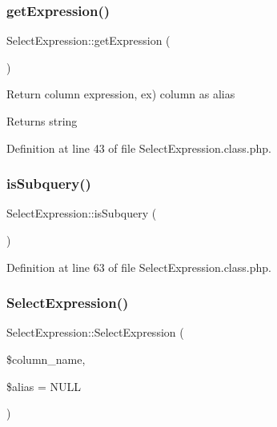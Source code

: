 \subsubsection{\texorpdfstring{get\+Expression()}{getExpression()}}
{\footnotesize\ttfamily Select\+Expression\+::get\+Expression (\begin{DoxyParamCaption}{ }\end{DoxyParamCaption})}

Return column expression, ex) column as alias \begin{DoxyReturn}{Returns}
string 
\end{DoxyReturn}


Definition at line 43 of file Select\+Expression.\+class.\+php.

\mbox{\label{classSelectExpression_a9b827b574a24dbbaa54932a639d8d5aa}} 
\subsubsection{\texorpdfstring{is\+Subquery()}{isSubquery()}}
{\footnotesize\ttfamily Select\+Expression\+::is\+Subquery (\begin{DoxyParamCaption}{ }\end{DoxyParamCaption})}



Definition at line 63 of file Select\+Expression.\+class.\+php.

\mbox{\label{classSelectExpression_abc497194c4a6ec6543f594d314f26143}} 
\subsubsection{\texorpdfstring{Select\+Expression()}{SelectExpression()}}
{\footnotesize\ttfamily Select\+Expression\+::\+Select\+Expression (\begin{DoxyParamCaption}\item[{}]{\$column\+\_\+name,  }\item[{}]{\$alias = {\ttfamily NULL} }\end{DoxyParamCaption})}


